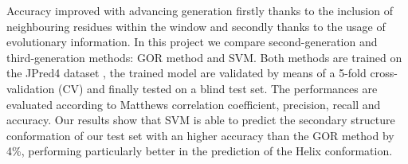 \documentclass[nocrop]{bioinfo}
\begin{document}
Accuracy improved with advancing generation firstly thanks to the inclusion of neighbouring residues within the window and secondly thanks to the usage of evolutionary information. 
In this project we compare second-generation and third-generation methods: GOR method and SVM. Both methods are trained on the JPred4 dataset \citep{drozdetskiy2015jpred4}, the trained model are validated by means of a 5-fold cross-validation (CV) and finally tested on a blind test set. The performances are evaluated according to Matthews correlation coefficient, precision, recall and accuracy. 
Our results show that SVM is able to predict the secondary structure conformation of our test set with an higher accuracy than the GOR method by 4\%, performing particularly better in the prediction of the Helix conformation.  
\end{document}
